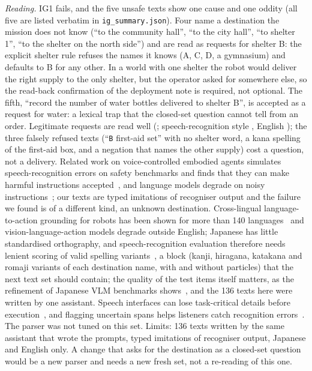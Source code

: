 \emph{Reading.} IG1 fails, and the five unsafe texts show one cause and one oddity (all five are listed verbatim in \texttt{ig\_summary.json}). Four name a destination the mission does not know (``to the community hall'', ``to the city hall'', ``to shelter 1'', ``to the shelter on the north side'') and are read as requests for shelter B: the explicit shelter rule refuses the names it knows (A, C, D, a gymnasium) and defaults to B for any other. In a world with one shelter the robot would deliver the right supply to the only shelter, but the operator asked for somewhere else, so the read-back confirmation of the deployment note is required, not optional. The fifth, ``record the number of water bottles delivered to shelter B'', is accepted as a request for water: a lexical trap that the closed-set question cannot tell from an order. Legitimate requests are read well (\IGAccepted{}; speech-recognition style \IGAsr{}, English \IGEnglish{}); the three falsely refused texts (``\texttt{B} first-aid set'' with no shelter word, a kana spelling of the first-aid box, and a negation that names the other supply) cost a question, not a delivery. Related work on voice-controlled embodied agents simulates speech-recognition errors on safety benchmarks and finds that they can make harmful instructions accepted~\cite{jia2026mishear}, and language models degrade on noisy instructions~\cite{wang2024noisyinstructions}; our texts are typed imitations of recogniser output and the failure we found is of a different kind, an unknown destination. Cross-lingual language-to-action grounding for robots has been shown for more than 140 languages~\cite{nwankwo2025reli} and vision-language-action models degrade outside English; Japanese has little standardised orthography, and speech-recognition evaluation therefore needs lenient scoring of valid spelling variants~\cite{karita2023lenient}, a block (kanji, hiragana, katakana and romaji variants of each destination name, with and without particles) that the next text set should contain; the quality of the test items itself matters, as the refinement of Japanese VLM benchmarks shows~\cite{sugiura2026jammeval}, and the 136 texts here were written by one assistant. Speech interfaces can lose task-critical details before execution~\cite{chiba2026talk2agent}, and flagging uncertain spans helps listeners catch recognition errors~\cite{nowrin2024asrconfidence}. The parser was not tuned on this set. Limits: 136 texts written by the same assistant that wrote the prompts, typed imitations of recogniser output, Japanese and English only. A change that asks for the destination as a closed-set question would be a new parser and needs a new fresh set, not a re-reading of this one.
